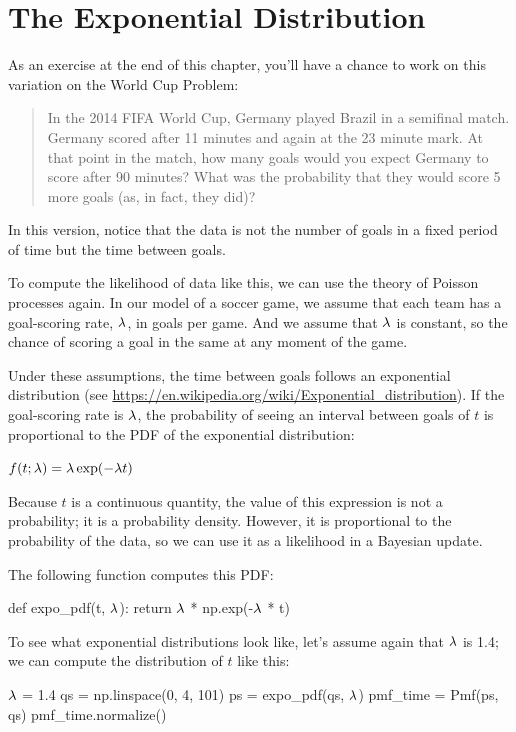 \documentclass[12pt]{book}
\theoremstyle{exercise}
\begin{document}
\section{The Exponential Distribution}
\label{exponential}

As an exercise at the end of this chapter, you'll have a chance to work on  this variation on the World Cup Problem:

\begin{quote}
In the 2014 FIFA World Cup, Germany played Brazil in a semifinal match. Germany scored after 11 minutes and again at the 23 minute mark.
At that point in the match, how many goals would you expect Germany to score after 90 minutes?
What was the probability that they would score 5 more goals (as, in fact, they did)?
\end{quote}

In this version, notice that the data is not the number of goals in a fixed period of time but the time between goals.

To compute the likelihood of data like this, we can use the theory of Poisson processes again.
In our model of a soccer game, we assume that each team has a goal-scoring rate, $\mathtt{\lambda}$, in goals per game.
And we assume that $\mathtt{\lambda}$ is constant, so the chance of scoring a goal in the same at any moment of the game.

Under these assumptions, the time between goals follows an exponential distribution (see \url{https://en.wikipedia.org/wiki/Exponential_distribution}).
If the goal-scoring rate is $\mathtt{\lambda}$, the probability of seeing an interval between goals of $t$ is proportional to the PDF of the exponential distribution:

$f(t; \mathtt{\lambda}) = \mathtt{\lambda} \exp(-\mathtt{\lambda} t)$

Because $t$ is a continuous quantity, the value of this expression is not a probability; it is a probability density.
However, it is proportional to the probability of the data, so we can use it as a likelihood in a Bayesian update.

The following function computes this PDF:

\begin{code}
def expo_pdf(t, $\mathtt{\lambda}$):
    return $\mathtt{\lambda}$ * np.exp(-$\mathtt{\lambda}$ * t)
\end{code}

To see what exponential distributions look like, let's assume again that $\mathtt{\lambda}$ is 1.4; we can compute the distribution of $t$ like this:

\begin{code}
$\mathtt{\lambda}$ = 1.4
qs = np.linspace(0, 4, 101)
ps = expo_pdf(qs, $\mathtt{\lambda}$)
pmf_time = Pmf(ps, qs)
pmf_time.normalize()
\end{code}
\end{document}
